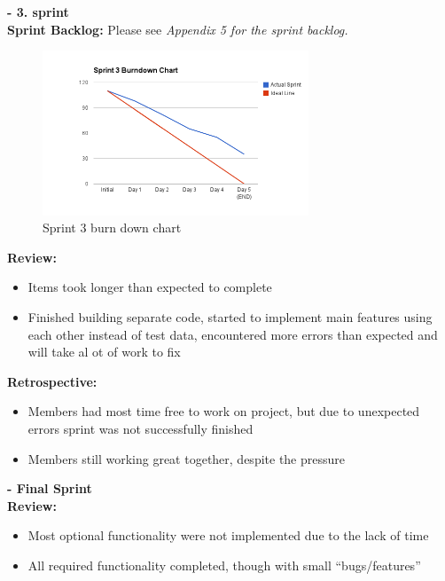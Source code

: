 \documentclass[11pt]{article}
\begin{document}
\textbf{- 3. sprint} \\

\textbf{Sprint Backlog:} Please see \emph{Appendix 5 for the sprint backlog.}
\begin{figure}[H]
  		\centering
    	\includegraphics[width=300px]{images/SCRUM/Sprint 3 burndown chart.png}
    	\caption{Sprint 3 burn down chart}
\end{figure}

     \textbf{Review:}
\begin{itemize}
\item Items took longer than expected to complete
\item Finished building separate code, started to implement main features using each other
       instead of test data, encountered more errors than expected and will take al ot of
       work to fix
\end{itemize}

     \textbf{Retrospective:}
\begin{itemize}
\item Members had most time free to work on project, but due to unexpected errors
       sprint was not successfully finished
\item Members still working great together, despite the pressure
\end{itemize}


\textbf{- Final Sprint} \\
\textbf{Review:}
\begin{itemize}
\item Most optional functionality were not implemented due to the lack of time
\item All required functionality completed, though with small ``bugs/features''
\end{itemize}
\end{document}

